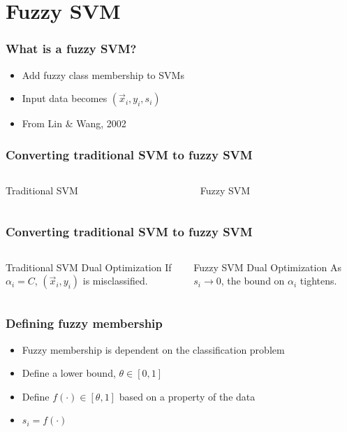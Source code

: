 \section{Fuzzy SVM}

\begin{frame}
    \frametitle{What is a fuzzy SVM?}
    \begin{itemize}
        \item Add fuzzy class membership to SVMs
        \item Input data becomes \(\left(\vec{x}_i, y_i, s_i\right)\)
        \item From Lin \& Wang, 2002 \cite{991432}
    \end{itemize}
\end{frame}

\begin{frame}
    \frametitle{Converting traditional SVM to fuzzy SVM}
    \begin{columns}[T]
        \begin{column}{0.5\textwidth}
            Traditional SVM
            \svmEquation
        \end{column}
        \begin{column}{0.5\textwidth}
            Fuzzy SVM
            \fuzzySvmEquation
        \end{column}
    \end{columns}
\end{frame}

\begin{frame}
    \frametitle{Converting traditional SVM to fuzzy SVM}
    \begin{columns}[T]
        \begin{column}{0.5\textwidth}
            Traditional SVM Dual Optimization
            \traditionalDual
            If \(\alpha_i = C\), \(\left(\vec{x}_i, y_i\right)\) is misclassified.
        \end{column}
        \begin{column}{0.5\textwidth}
            Fuzzy SVM Dual Optimization
            \fuzzyDual
            As \(s_i \to 0\), the bound on \(\alpha_i\) tightens.
        \end{column}
    \end{columns}
\end{frame}

\begin{frame}
    \frametitle{Defining fuzzy membership}
    \begin{itemize}
        \item Fuzzy membership is dependent on the classification problem
        \item Define a lower bound, \(\theta \in [0, 1]\)
        \item Define \(f(\cdot) \in [\theta, 1]\) based on a property of the data
        \item \(s_i = f(\cdot)\)
    \end{itemize}
\end{frame}
